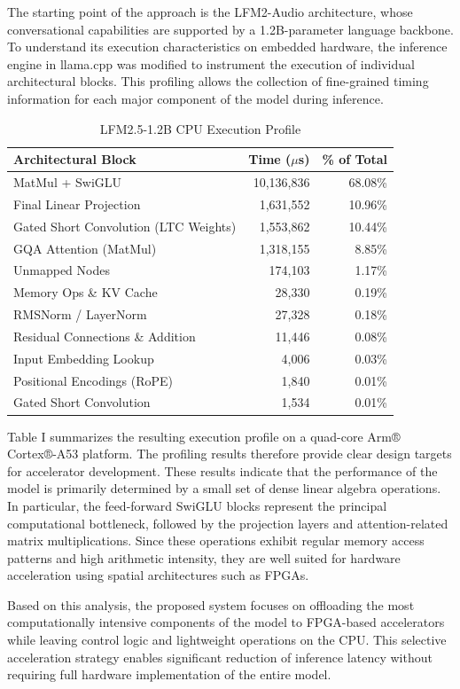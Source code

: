 \documentclass[conference]{IEEEtran}
\begin{document}
The starting point of the approach is the LFM2-Audio architecture, whose conversational capabilities are supported by a 1.2B-parameter language backbone. To understand its execution characteristics on embedded hardware, the inference engine in llama.cpp was modified to instrument the execution of individual architectural blocks. This profiling allows the collection of fine-grained timing information for each major component of the model during inference.
\begin{table}[h]
\centering
\caption{LFM2.5-1.2B CPU Execution Profile}
\begin{tabular}{lrr}
\hline
\textbf{Architectural Block} & \textbf{Time ($\mu$s)} & \textbf{\% of Total} \\ \hline
MatMul + SwiGLU & 10,136,836 & 68.08\% \\
Final Linear Projection & 1,631,552 & 10.96\% \\
Gated Short Convolution (LTC Weights) & 1,553,862 & 10.44\% \\
GQA Attention (MatMul) & 1,318,155 & 8.85\% \\
Unmapped Nodes & 174,103 & 1.17\% \\
Memory Ops \& KV Cache & 28,330 & 0.19\% \\
RMSNorm / LayerNorm & 27,328 & 0.18\% \\
Residual Connections \& Addition & 11,446 & 0.08\% \\
Input Embedding Lookup & 4,006 & 0.03\% \\
Positional Encodings (RoPE) & 1,840 & 0.01\% \\
Gated Short Convolution & 1,534 & 0.01\% \\ \hline
\end{tabular}
\end{table}

Table I summarizes the resulting execution profile on a quad-core Arm® Cortex®-A53 platform. The profiling results therefore provide clear design targets for accelerator development.
These results indicate that the performance of the model is primarily determined by a small set of dense linear algebra operations. In particular, the feed-forward SwiGLU blocks represent the principal computational bottleneck, followed by the projection layers and attention-related matrix multiplications. Since these operations exhibit regular memory access patterns and high arithmetic intensity, they are well suited for hardware acceleration using spatial architectures such as FPGAs.

Based on this analysis, the proposed system focuses on offloading the most computationally intensive components of the model to FPGA-based accelerators while leaving control logic and lightweight operations on the CPU. This selective acceleration strategy enables significant reduction of inference latency without requiring full hardware implementation of the entire model. 
\end{document}
